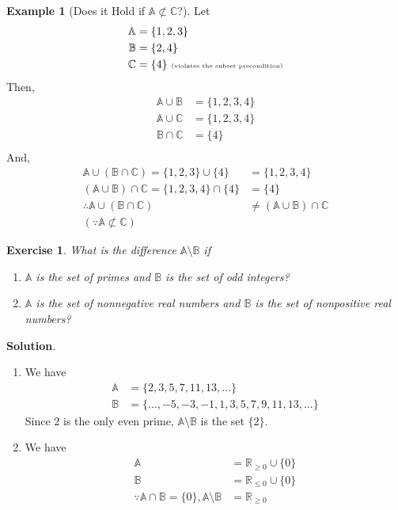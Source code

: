 \documentclass[11pt]{book}
\theoremstyle{definition}
\theoremstyle{plain}
\newtheorem{exercise}{Exercise}
\theoremstyle{definition}
\newtheorem{example}{Example}
\theoremstyle{problemstyle}
\theoremstyle{remark}
\theoremstyle{definition}
\begin{document}
\begin{example}[Does it Hold if $\mathbb{A}\not\subset\mathbb{C}$?]
    Let
    \begin{align*}
        \mathbb{A}&=\{1,2,3\}\\
        \mathbb{B}&=\{2,4\}\\
        \mathbb{C}&=\{4\}\text{ \tiny{(violates the subset precondition)}}\\
    \end{align*}
    Then, 
    \begin{align*}
        \mathbb{A}\cup\mathbb{B}&=\{1,2,3,4\}\\
        \mathbb{A}\cup\mathbb{C}&=\{1,2,3,4\}\\
        \mathbb{B}\cap\mathbb{C}&=\{4\}\\
    \end{align*}
    And,
    \begin{align*}
        \mathbb{A}\cup(\mathbb{B}\cap\mathbb{C})=\{1,2,3\}\cup\{4\}&=\{1,2,3,4\}\\
        (\mathbb{A}\cup\mathbb{B})\cap\mathbb{C}=\{1,2,3,4\}\cap\{4\}&=\{4\}\\
        \therefore\mathbb{A}\cup(\mathbb{B}\cap\mathbb{C})&\ne(\mathbb{A}\cup\mathbb{B})\cap\mathbb{C}\\
        (\because\mathbb{A}\not\subset\mathbb{C})&
    \end{align*}
\end{example}
\begin{exercise}
    What is the difference $\mathbb{A}\setminus\mathbb{B}$ if
    \begin{enumerate}[label=(\alph*)]
        \item $\mathbb{A}$ is the set of primes and $\mathbb{B}$ is the set of odd integers?
        \item $\mathbb{A}$ is the set of nonnegative real numbers and $\mathbb{B}$ is the set of nonpositive real numbers?
    \end{enumerate}
    \label{ex:1.8.18}
\end{exercise}
\textbf{Solution}.
    \begin{enumerate}[label=(\alph*)]
        \item We have 
        \begin{align*}
            \mathbb{A}&=\{2,3,5,7,11,13,\dots\}\\
            \mathbb{B}&=\{\dots,-5,-3,-1,1,3,5,7,9,11,13,\dots\}
        \end{align*}
            Since $2$ is the only even prime, $\mathbb{A}\setminus\mathbb{B}$ is the set $\{2\}$.
        \item We have
        \begin{align*}
            \mathbb{A}&=\mathbb{R}_{\geq0}\cup\{0\}\\
            \mathbb{B}&=\mathbb{R}_{\leq0}\cup\{0\}\\
            \because\mathbb{A}\cap\mathbb{B}=\{0\},\mathbb{A}\setminus\mathbb{B}&=\mathbb{R}_{\geq0}
        \end{align*}
    \end{enumerate}
\end{document}
